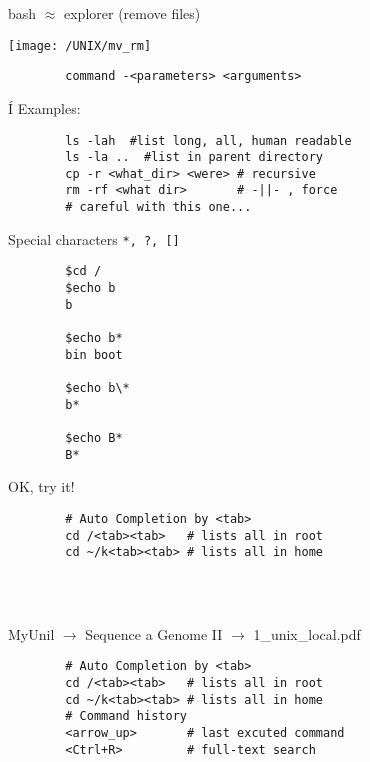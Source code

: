 \documentclass[xcolor=dvipsnames]{beamer}
\begin{document}
\begin{frame}
	bash $\approx$ explorer (remove files)
	\begin{center}
		\texttt{[image: /UNIX/mv\_rm]}
	\end{center}
\end{frame}

\begin{frame}[fragile]
	\begin{verbatim}
		command -<parameters> <arguments>
	\end{verbatim}Í
	Examples:
	\begin{verbatim}
		ls -lah  #list long, all, human readable
		ls -la ..  #list in parent directory
		cp -r <what_dir> <were> # recursive
		rm -rf <what dir>       # -||- , force
		# careful with this one...
	\end{verbatim}
\end{frame}

\begin{frame}[fragile]
	\huge
	Special characters \verb!*, ?, []!
	\Large
	\begin{verbatim}
		$cd /
		$echo b
		b
		
		$echo b*
		bin boot
		
		$echo b\*
		b*
		
		$echo B*
		B*

	\end{verbatim}
\end{frame}

\begin{frame}[fragile]
	\Huge
	\begin{center}
		OK, try it!	
	\end{center}
	\Large
	\begin{verbatim}
		# Auto Completion by <tab>
		cd /<tab><tab>   # lists all in root
		cd ~/k<tab><tab> # lists all in home
		
		
		
	\end{verbatim}
\end{frame}

\begin{frame}[fragile]
	\begin{center}
		MyUnil $\rightarrow$ Sequence a Genome II $\rightarrow$ 1\_unix\_local.pdf
	\end{center}
	\Large
	\begin{verbatim}
		# Auto Completion by <tab>
		cd /<tab><tab>   # lists all in root
		cd ~/k<tab><tab> # lists all in home
		# Command history
		<arrow_up>       # last excuted command
		<Ctrl+R>         # full-text search
	\end{verbatim}
\end{frame}
\end{document}
